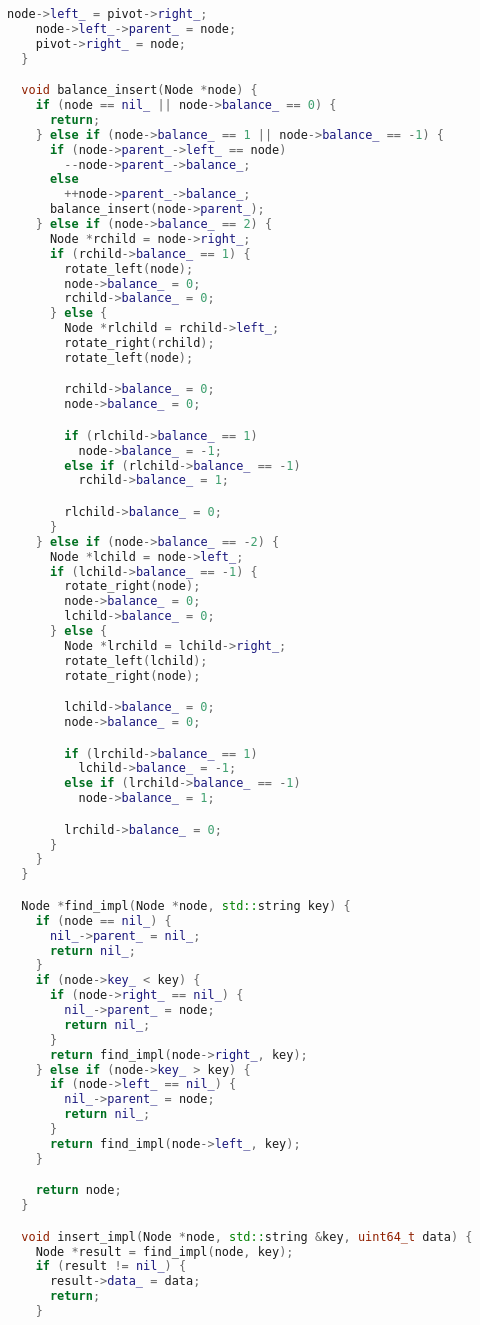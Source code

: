 \begin{lstlisting}[language=C++]
    node->left_ = pivot->right_;
    node->left_->parent_ = node;
    pivot->right_ = node;
  }

  void balance_insert(Node *node) {
    if (node == nil_ || node->balance_ == 0) {
      return;
    } else if (node->balance_ == 1 || node->balance_ == -1) {
      if (node->parent_->left_ == node)
        --node->parent_->balance_;
      else
        ++node->parent_->balance_;
      balance_insert(node->parent_);
    } else if (node->balance_ == 2) {
      Node *rchild = node->right_;
      if (rchild->balance_ == 1) {
        rotate_left(node);
        node->balance_ = 0;
        rchild->balance_ = 0;
      } else {
        Node *rlchild = rchild->left_;
        rotate_right(rchild);
        rotate_left(node);

        rchild->balance_ = 0;
        node->balance_ = 0;

        if (rlchild->balance_ == 1)
          node->balance_ = -1;
        else if (rlchild->balance_ == -1)
          rchild->balance_ = 1;

        rlchild->balance_ = 0;
      }
    } else if (node->balance_ == -2) {
      Node *lchild = node->left_;
      if (lchild->balance_ == -1) {
        rotate_right(node);
        node->balance_ = 0;
        lchild->balance_ = 0;
      } else {
        Node *lrchild = lchild->right_;
        rotate_left(lchild);
        rotate_right(node);

        lchild->balance_ = 0;
        node->balance_ = 0;

        if (lrchild->balance_ == 1)
          lchild->balance_ = -1;
        else if (lrchild->balance_ == -1)
          node->balance_ = 1;

        lrchild->balance_ = 0;
      }
    }
  }

  Node *find_impl(Node *node, std::string key) {
    if (node == nil_) {
      nil_->parent_ = nil_;
      return nil_;
    }
    if (node->key_ < key) {
      if (node->right_ == nil_) {
        nil_->parent_ = node;
        return nil_;
      }
      return find_impl(node->right_, key);
    } else if (node->key_ > key) {
      if (node->left_ == nil_) {
        nil_->parent_ = node;
        return nil_;
      }
      return find_impl(node->left_, key);
    }

    return node;
  }

  void insert_impl(Node *node, std::string &key, uint64_t data) {
    Node *result = find_impl(node, key);
    if (result != nil_) {
      result->data_ = data;
      return;
    }


\end{lstlisting}
